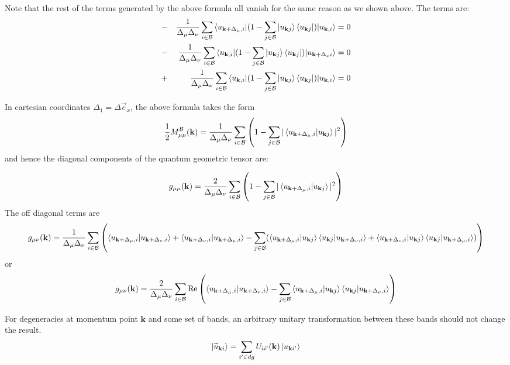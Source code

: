 \documentclass[onecolumn, prb,preprintnumbers,amsmath,amssymb,floatfix]{revtex4}
\newcommand{\vk}{{\mathbf{k}}}
\newcommand{\cb}{{\cal B}}
\begin{document}
Note that the rest of the terms generated by the above formula all vanish for the same reason as we shown above. The terms are:
\begin{eqnarray}
&-&  \frac{1}{\Delta_\mu\Delta_\nu}\sum_{i\in \cb}\braket{ u_{\vk+\Delta_\mu,i}|(1-\sum_{j\in \cb}\ket{u_{\vk j}}\bra{u_{\vk j}})|u_{\vk,i}}=0\\
&-&  \frac{1}{\Delta_\mu\Delta_\nu}\sum_{i\in \cb}\braket{ u_{\vk,i}|(1-\sum_{j\in \cb}\ket{u_{\vk j}}\bra{u_{\vk j}})|u_{\vk+\Delta_\nu i}}=0\\
&+&  \frac{1}{\Delta_\mu\Delta_\nu}\sum_{i\in \cb}\braket{u_{\vk,i}|(1-\sum_{j\in \cb}\ket{u_{\vk j}}\bra{u_{\vk j}})|u_{\vk,i}}=0
\end{eqnarray}

In cartesian coordinates $\Delta_1=\Delta \vec{e}_{x}$, the above formula takes the form
\begin{eqnarray}
\frac{1}{2} M_{\mu\mu}^{\cb}(\vk)  =
  \frac{1}{\Delta_\mu\Delta_\nu}\sum_{i \in\cb}
  \left(1  -\sum_{j\in\cb} |\braket{ u_{\vk+\Delta_\mu,i}|u_{\vk j}}|^2\right)
\end{eqnarray}
and hence the diagonal components of the quantum geometric tensor are:

\begin{eqnarray}
g_{\mu\mu}(\vk)  =
  \frac{2}{\Delta_\mu\Delta_\nu}\sum_{i \in \cb}
  \left(1  -\sum_{j\in\cb} |\braket{ u_{\vk+\Delta_\mu,i}|u_{\vk j}}|^2\right)
\label{Eq:20}
\end{eqnarray}
The off diagonal terms are
\begin{eqnarray}
g_{\mu\nu}(\vk)  =
  \frac{1}{\Delta_\mu\Delta_\nu}\sum_{i \in\cb}
  \left(
    \braket{u_{\vk+\Delta_\mu,i}|u_{\vk+\Delta_\nu,i}}
  +\braket{u_{\vk+\Delta_\nu,i}|u_{\vk+\Delta_\mu,i}}
  -\sum_{j\in\cb}
  (\braket{ u_{\vk+\Delta_\mu,i}|u_{\vk j}}\braket{u_{\vk j}| u_{\vk+\Delta_\nu,i}}+
  \braket{ u_{\vk+\Delta_\nu,i}|u_{\vk j}}\braket{u_{\vk j}| u_{\vk+\Delta_\mu,i}})
  \right)
\end{eqnarray}
or
\begin{eqnarray}
g_{\mu\nu}(\vk)  =
  \frac{2}{\Delta_\mu\Delta_\nu}\sum_{i \in\cb}
  \textrm{Re}\left(
    \braket{u_{\vk+\Delta_\mu,i}|u_{\vk+\Delta_\nu,i}}
  -\sum_{j\in\cb}
  \braket{ u_{\vk+\Delta_\mu,i}|u_{\vk j}}\braket{u_{\vk j}| u_{\vk+\Delta_\nu,i}}
  \right)
\end{eqnarray}

For degeneracies at momentum point $\vk$ and some set of bands, an arbitrary unitary transformation between these bands should not change the result.
$$\ket{\widetilde{u}_{\vk i}} = \sum_{i'\in dg}U_{i i'}(\vk) \ket{u_{\vk i'}} $$
\end{document}
